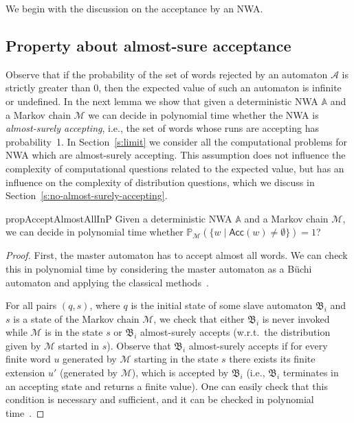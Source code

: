 \documentclass{lmcs}
\newcommand{\nestedA}{\mathbb{A}}
\newcommand{\slaveA}{{\mathfrak{B}}}
\newcommand{\buchi}{B\"{u}chi}
\newcommand{\aut}{\mathcal{A}}
\newcommand{\Acc}{\mathsf{Acc}}
\newcommand{\probability}{\mathbb{P}}
\newcommand{\markov}{\mathcal{M}}
\begin{document}
We begin with the discussion on the acceptance by an NWA\@.


\subsection{Property about almost-sure acceptance}

Observe that if the probability of the set of words rejected by an automaton $\aut$
is strictly greater than $0$, then the expected value of such an automaton
is infinite or undefined.
In the next lemma we show that given a deterministic NWA $\nestedA$ and
a Markov chain $\markov$ we can decide in polynomial time
whether the NWA is \emph{almost-surely accepting}, i.e., the set of words whose runs are accepting has probability~1.
In Section~\ref{s:limit}  we consider all the computational problems for NWA which are almost-surely accepting.
This assumption does not influence the complexity of computational questions
related to the expected value, but has an influence on
the complexity of distribution questions, which we discuss in Section~\ref{s:no-almost-surely-accepting}.

\begin{restatable}{prop}{AcceptAlmostAllInP}\label{prop:almostAll}
Given a deterministic NWA $\nestedA$ and a Markov chain $\markov$, we can decide in
polynomial time whether $\probability_{\markov}(\{w \mid \Acc(w) \neq \emptyset\})=1$?
\end{restatable}
\begin{proof}
First, the master automaton has to accept almost all words. We can check this in polynomial time by considering the master automaton as a \buchi{} automaton and applying the classical methods~\cite{BaierBook}.

For all pairs $(q,s)$, where $q$ is the initial state of some slave automaton $\slaveA_i$ and $s$ is a state of the Markov chain $\markov$,
we check that either $\slaveA_i$ is never invoked while $\markov$ is in the state $s$ or $\slaveA_i$ almost-surely accepts (w.r.t.\ the distribution given by $\markov$
started in $s$).
Observe that $\slaveA_i$ almost-surely accepts if for every finite word $u$ generated by $\markov$ starting in the state $s$ there exists its finite extension $u'$ (generated by $\markov$), which is accepted by $\slaveA_i$
(i.e., $\slaveA_i$ terminates in an accepting state and returns a finite value).
One can easily check that this condition is necessary and sufficient, and it can be checked in polynomial time~\cite{BaierBook}.
\end{proof}
\end{document}
